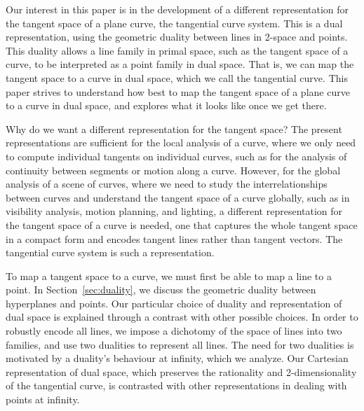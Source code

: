 \documentclass[12pt]{article}
\begin{document}
Our interest in this paper is in the development of 
a different representation for the
tangent space of a plane curve, the tangential curve system.
This is a dual representation, using the geometric duality between lines in 2-space and points.
This duality allows a line family in primal space, such as the tangent space of a curve,
to be interpreted as a point family in dual space.
That is, we can map the tangent space to a curve in dual space, which
we call the tangential curve.
This paper strives to understand how best to map the tangent space of a plane curve 
to a curve in dual space, and explores what it looks like once we get there.

Why do we want a different representation for the tangent space?
The present representations 
are sufficient for the local analysis of a curve,
where we only need to compute individual tangents on individual curves,
such as for the analysis of continuity between segments or motion along a curve.
However, for the global analysis of a scene of curves,
where we need to study the interrelationships between curves and understand the
tangent space of a curve globally,
such as in visibility analysis, motion planning, and lighting,
a different representation for the tangent space of a curve is needed,
one that captures the whole tangent space in a compact form 
and encodes tangent lines rather than tangent vectors.
The tangential curve system is such a representation.

To map a tangent space to a curve, we must first be able to map a line to a point.
In Section~\ref{sec:duality}, we discuss the geometric duality between hyperplanes and points.
Our particular choice of duality and representation of dual space is explained through
a contrast with other possible choices.
In order to robustly encode all lines, we impose a dichotomy of the space of lines into two families,
and use two dualities to represent all lines.
The need for two dualities is motivated by a duality's behaviour at infinity,
which we analyze.
Our Cartesian representation of dual space, which preserves the rationality 
and 2-dimensionality of the tangential curve, 
is contrasted with other representations in dealing with points at infinity.
\end{document}
